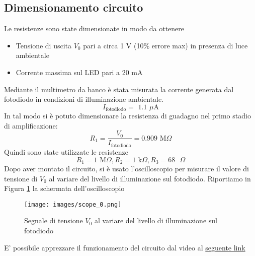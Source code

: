 \subsection{Dimensionamento circuito}
Le resistenze sono state dimensionate in modo da ottenere
\begin{itemize}
    \item Tensione di uscita $V_0$ pari a circa 1 V (10\% errore max) in presenza di luce ambientale
    \item Corrente massima sul LED pari a 20 mA
\end{itemize}
Mediante il multimetro da banco è stata misurata la corrente generata dal fotodiodo in condizioni di illuminazione ambientale. 
\begin{equation*}
    I_{\text{fotodiodo}}= \text{ 1.1 } \mu\text{A}
\end{equation*}
In tal modo si è potuto dimensionare la resistenza di guadagno nel primo stadio di amplificazione:
\begin{equation}
    R_1=\frac{V_0}{I_{\text{fotodiodo}}}=0.909\text{ M}\Omega
\end{equation}
Quindi sono state utilizzate le resistenze
\begin{equation*}
    R_1 = 1\text{ M}\Omega, R_2 = 1\text{ k}\Omega, R_3 = 68\text{ }\Omega
\end{equation*}
Dopo aver montato il circuito, si è usato l'oscilloscopio per misurare il valore di tensione di $V_0$ al variare del livello di illuminazione sul fotodiodo. Riportiamo in Figura \ref{fig:scope_0} la schermata dell'oscilloscopio
\begin{figure}[H]
    \centering
    \texttt{[image: images/scope\_0.png]}
    \caption{Segnale di tensione $V_0$ al variare del livello di illuminazione sul fotodiodo}
    \label{fig:scope_0}
\end{figure}
E' possibile apprezzare il funzionamento del circuito dal video al \href{https://mediaspace.unipd.it/media/Esperimento+4/1_9r5biz93}{seguente link}
